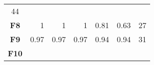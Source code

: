 \documentclass[12pt,a4paper]{article}
\begin{document}
\begin{longtable}[c]{@{}crrrrrr@{}}
\begin{minipage}[t]{0.07\columnwidth}
44
\strut\end{minipage}\tabularnewline
\begin{minipage}[t]{0.11\columnwidth}\centering\strut
\textbf{F8}
\strut\end{minipage} &
\begin{minipage}[t]{0.07\columnwidth}\raggedleft\strut
1
\strut\end{minipage} &
\begin{minipage}[t]{0.08\columnwidth}\raggedleft\strut
1
\strut\end{minipage} &
\begin{minipage}[t]{0.09\columnwidth}\raggedleft\strut
1
\strut\end{minipage} &
\begin{minipage}[t]{0.10\columnwidth}\raggedleft\strut
0.81
\strut\end{minipage} &
\begin{minipage}[t]{0.11\columnwidth}\raggedleft\strut
0.63
\strut\end{minipage} &
\begin{minipage}[t]{0.07\columnwidth}\raggedleft\strut
27
\strut\end{minipage}\tabularnewline
\begin{minipage}[t]{0.11\columnwidth}\centering\strut
\textbf{F9}
\strut\end{minipage} &
\begin{minipage}[t]{0.07\columnwidth}\raggedleft\strut
0.97
\strut\end{minipage} &
\begin{minipage}[t]{0.08\columnwidth}\raggedleft\strut
0.97
\strut\end{minipage} &
\begin{minipage}[t]{0.09\columnwidth}\raggedleft\strut
0.97
\strut\end{minipage} &
\begin{minipage}[t]{0.10\columnwidth}\raggedleft\strut
0.94
\strut\end{minipage} &
\begin{minipage}[t]{0.11\columnwidth}\raggedleft\strut
0.94
\strut\end{minipage} &
\begin{minipage}[t]{0.07\columnwidth}\raggedleft\strut
31
\strut\end{minipage}\tabularnewline
\begin{minipage}[t]{0.11\columnwidth}\centering\strut
\textbf{F10}
\strut\end{minipage} &
\begin{minipage}[t]{0.07\columnwidth}\raggedleft\strut

\end{minipage}
\end{longtable}
\end{document}
